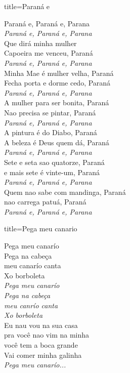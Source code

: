 \documentclass[fontsize=14pt, paper=a4, twoside, DIV=20]{scrreprt} %
\begin{document}
\begin{multicols*}{2}
\begin{song}{title={Paraná e}}
        \begin{verse*}
            Paraná e, Paraná e, Parana\\
            \textit{Paraná e, Paraná e, Parana}\\
            Que dirá minha mulher\\
            Capoeira me venceu, Paraná\\
            \textit{Paraná e, Paraná e, Parana}\\
            Minha Mae é mulher velha, Paraná\\
            Fecha porta e dorme cedo, Paraná\\
            \textit{Paraná e, Paraná e, Parana}\\
            A mulher para ser bonita, Paraná\\
            Nao precisa se pintar, Paraná\\
            \textit{Paraná e, Paraná e, Parana}\\
            A pintura é do Diabo, Paraná\\
            A beleza é Deus quem dá, Paraná\\
            \textit{Paraná e, Paraná e, Parana}\\
            Sete e seta sao quatorze, Paraná\\
            e mais sete é vinte-um, Paraná\\
            \textit{Paraná e, Paraná e, Parana}\\
            Quem nao sabe com mandinga, Paraná\\
            nao carrega patuá, Paraná\\
            \textit{Paraná e, Paraná e, Parana}\\
        \end{verse*}
\end{song}

\begin{song}{title={Pega meu canario}}
        \begin{verse*}
            Pega meu canarío\\
            Pega na cabeça\\
            meu canarío canta\\
            Xo borboleta\\
            \textit{Pega meu canarío}\\
            \textit{Pega na cabeça}\\
            \textit{meu canrío canta}\\
            \textit{Xo borboleta}\\
            Eu nau vou na sua casa\\
            pra você nao vim na minha\\
            você tem a boca grande\\
            Vai comer minha galinha\\
            \textit{Pega meu canarío...}\\
        \end{verse*}
\end{song}


\end{multicols*}
\end{document}
